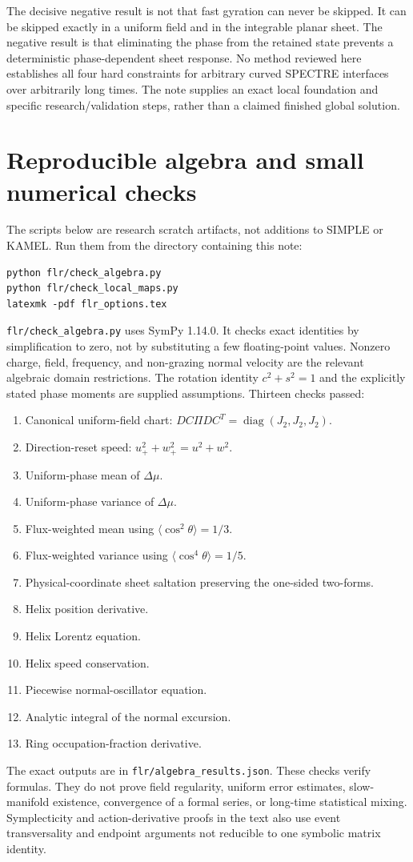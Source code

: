\documentclass[10pt,a4paper]{article}
\newcommand{\avg}[1]{\langle #1\rangle}
\newcommand{\pathref}[1]{\texttt{\nolinkurl{#1}}}
\begin{document}
The decisive negative result is not that fast gyration can never be skipped. It can be skipped exactly in a uniform field and in the integrable planar sheet. The negative result is that eliminating the phase from the retained state prevents a deterministic phase-dependent sheet response. No method reviewed here establishes all four hard constraints for arbitrary curved SPECTRE interfaces over arbitrarily long times. The note supplies an exact local foundation and specific research/validation steps, rather than a claimed finished global solution.

\appendix
\section{Reproducible algebra and small numerical checks}
\label{app:checks}
The scripts below are research scratch artifacts, not additions to SIMPLE or KAMEL. Run them from the directory containing this note:
\begin{verbatim}
python flr/check_algebra.py
python flr/check_local_maps.py
latexmk -pdf flr_options.tex
\end{verbatim}
\pathref{flr/check_algebra.py} uses SymPy 1.14.0. It checks exact identities by simplification to zero, not by substituting a few floating-point values. Nonzero charge, field, frequency, and non-grazing normal velocity are the relevant algebraic domain restrictions. The rotation identity $c^2+s^2=1$ and the explicitly stated phase moments are supplied assumptions. Thirteen checks passed:
\begin{enumerate}
\item Canonical uniform-field chart: $D C\Pi D C^T=\operatorname{diag}(J_2,J_2,J_2)$.
\item Direction-reset speed: $u_+^2+w_+^2=u^2+w^2$.
\item Uniform-phase mean of $\Delta\mu$.
\item Uniform-phase variance of $\Delta\mu$.
\item Flux-weighted mean using $\avg{\cos^2\theta}=1/3$.
\item Flux-weighted variance using $\avg{\cos^4\theta}=1/5$.
\item Physical-coordinate sheet saltation preserving the one-sided two-forms.
\item Helix position derivative.
\item Helix Lorentz equation.
\item Helix speed conservation.
\item Piecewise normal-oscillator equation.
\item Analytic integral of the normal excursion.
\item Ring occupation-fraction derivative.
\end{enumerate}
The exact outputs are in \pathref{flr/algebra_results.json}. These checks verify formulas. They do not prove field regularity, uniform error estimates, slow-manifold existence, convergence of a formal series, or long-time statistical mixing. Symplecticity and action-derivative proofs in the text also use event transversality and endpoint arguments not reducible to one symbolic matrix identity.
\end{document}
